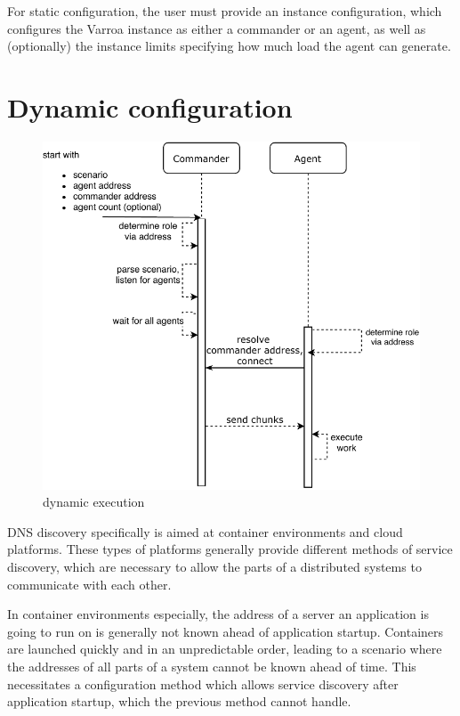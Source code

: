 For static configuration, the user must provide an instance configuration, which configures the Varroa instance as either a commander or an agent, as well as (optionally) the instance limits specifying how much load the agent can generate.

\section{Dynamic configuration}

\begin{figure}[h]
\begin{center}
\includegraphics[scale=0.65]{Resources/PDF/ExecutionDnsInit}
\caption{dynamic execution}
\end{center}
\end{figure}

DNS discovery specifically is aimed at container environments and cloud platforms. These types of platforms generally provide different methods of service discovery, which are necessary to allow the parts of a distributed systems to communicate with each other.

In container environments especially, the address of a server an application is going to run on is generally not known ahead of application startup. Containers are launched quickly and in an unpredictable order, leading to a scenario where the addresses of all parts of a system cannot be known ahead of time. This necessitates a configuration method which allows service discovery after application startup, which the previous method cannot handle.

